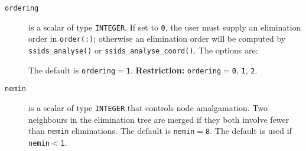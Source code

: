 \begin{description}

\item[\texttt{ordering}] is a scalar of
type  {\tt INTEGER}. If set to {\tt 0}, the user
must supply an elimination order in {\tt order(:)}; otherwise
an elimination order will be computed by {\tt ssids\_analyse()}
or {\tt ssids\_analyse\_coord()}.
The options are:
The default is {\tt ordering}$=${\tt 1}.
{\bf Restriction:} {\tt ordering}$=${\tt 0}, {\tt 1}, {\tt 2}.

\item[\texttt{nemin}] is a scalar of type  {\tt INTEGER} that controls
node amalgamation. Two neighbours in the elimination tree are merged
if they both involve fewer than {\tt nemin} eliminations.
The default is {\tt nemin$=$8}.
The default is used if {\tt nemin$<$1}.
\end{description}

